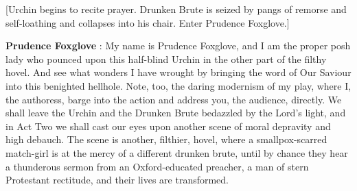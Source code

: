 [Urchin begins to recite prayer. Drunken Brute is seized by pangs of remorse and self-loathing and collapses into his chair. Enter Prudence Foxglove.]

\textbf{Prudence Foxglove} : My name is Prudence Foxglove, and I am the proper posh lady who pounced upon this half-blind Urchin in the other part of the filthy hovel. And see what wonders I have wrought by bringing the word of Our Saviour into this benighted hellhole. Note, too, the daring modernism of my play, where I, the authoress, barge into the action and address you, the audience, directly. We shall leave the Urchin and the Drunken Brute bedazzled by the Lord's light, and in Act Two we shall cast our eyes upon another scene of moral depravity and high debauch. The scene is another, filthier, hovel, where a smallpox-scarred match-girl is at the mercy of a different drunken brute, until by chance they hear a thunderous sermon from an Oxford-educated preacher, a man of stern Protestant rectitude, and their lives are transformed.
\endgroup